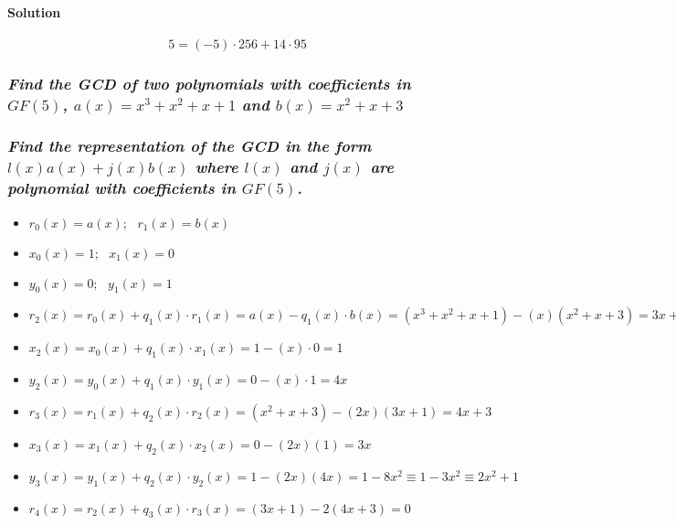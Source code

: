 \documentclass[11pt]{article}
\begin{document}
\hypertarget{solution}{%
\paragraph{Solution}\label{solution}}

\[5 = (-5)⋅256 + 14⋅95\]

    \hypertarget{find-the-gcd-of-two-polynomials-with-coefficients-in-gf5-ax-x3-x2-x-1-and-bx-x2-x-3}{%
\subsubsection{\texorpdfstring{\emph{Find the GCD of two polynomials
with coefficients in \(GF(5)\), \(a(x) = x^3 + x^2 + x + 1\) and
\(b(x) = x^2 + x +3\)}}{Find the GCD of two polynomials with coefficients in GF(5), a(x) = x\^{}3 + x\^{}2 + x + 1 and b(x) = x\^{}2 + x +3}}\label{find-the-gcd-of-two-polynomials-with-coefficients-in-gf5-ax-x3-x2-x-1-and-bx-x2-x-3}}

\hypertarget{find-the-representation-of-the-gcd-in-the-form-lxax-jxbx-where-lx-and-jx-are-polynomial-with-coefficients-in-gf5.}{%
\subsubsection{\texorpdfstring{\emph{Find the representation of the GCD
in the form \(l(x)a(x) + j(x)b(x)\) where \(l(x)\) and \(j(x)\) are
polynomial with coefficients in
\(GF(5)\).}}{Find the representation of the GCD in the form l(x)a(x) + j(x)b(x) where l(x) and j(x) are polynomial with coefficients in GF(5).}}\label{find-the-representation-of-the-gcd-in-the-form-lxax-jxbx-where-lx-and-jx-are-polynomial-with-coefficients-in-gf5.}}

\begin{itemize}
\item
  \(r_0(x) = a(x); \text{ }r_1(x) = b(x)\)
\item
  \(x_0(x) = 1; \text{ }x_1(x) = 0\)
\item
  \(y_0(x) = 0; \text{ }y_1(x) = 1\)
\item
  \(r_2(x) = r_0(x) + q_1(x)⋅r_1(x) = a(x) - q_1(x)⋅b(x) = (x^3 + x^2 + x + 1) - (x)(x^2 + x + 3) = 3x + 1\)
\item
  \(x_2(x) = x_0(x) + q_1(x)⋅x_1(x) = 1 - (x)⋅0 =1\)
\item
  \(y_2(x) = y_0(x) + q_1(x)⋅y_1(x) = 0 - (x)⋅1 =4x\)
\item
  \(r_3(x) = r_1(x) + q_2(x)⋅r_2(x) = (x^2 + x + 3) - (2x)(3x + 1) = 4x + 3\)
\item
  \(x_3(x) = x_1(x) + q_2(x)⋅x_2(x) = 0 - (2x)(1) = 3x\)
\item
  \(y_3(x) = y_1(x) + q_2(x)⋅y_2(x) = 1 - (2x)(4x) = 1 - 8x^2 ≡ 1 - 3x^2 ≡ 2x^2 + 1\)
\item
  \(r_4(x) = r_2(x) + q_3(x)⋅r_3(x) = (3x + 1) - 2(4x + 3) = 0\)
\end{itemize}
\end{document}
